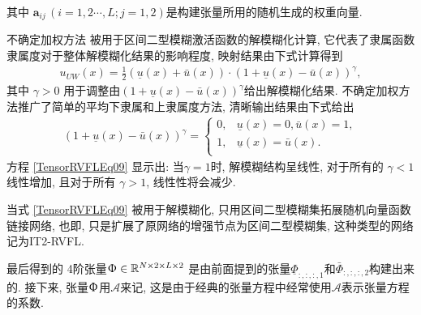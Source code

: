 其中 $\bm {a} _{ij} \,(i=1,2\cdots,L; j=1,2)$是构建张量所用的随机生成的权重向量.
\begin{remark}
不确定加权方法\cite{RunklerCoupland2018-6356} 被用于区间二型模糊激活函数的解模糊化计算,
它代表了隶属函数隶属度对于整体解模糊化结果的影响程度, 映射结果由下式计算得到
\begin{align} \label{TensorRVFLEq08}
    u_{UW} (x) =\frac 1 2 (\underline u(x) + \bar u(x))\cdot (1+\underline u(x)-\bar u(x))^\gamma,
\end{align}
其中 $\gamma > 0$ 用于调整由$(1+\underline u(x)-\bar u(x))^\gamma$给出解模糊化结果.
不确定加权方法推广了简单的平均下隶属和上隶属度方法, 清晰输出结果由下式给出
\begin{align} \label{TensorRVFLEq09}
  (1+\underline u(x)-\bar u(x))^\gamma=
  \left\{
  \begin{array} {ll}
    0,& \underline u(x)=0, \bar u(x)=1,\\
    1,&\underline u(x)=\bar u(x).\\
  \end{array}
  \right.
\end{align}
方程 \eqref{TensorRVFLEq09} 显示出: 当$\gamma =1$时, 解模糊结构呈线性, 对于所有的 $\gamma<1$ 线性增加, 且对于所有 $\gamma>1$, 线性性将会减少.
\end{remark}
\begin{remark}
当式 \eqref{TensorRVFLEq09} 被用于解模糊化, 只用区间二型模糊集拓展随机向量函数链接网络, 也即, 只是扩展了原网络的增强节点为区间二型模糊集, 这种类型的网络记为IT2-RVFL.
\end{remark}

最后得到的 4阶张量$\Upphi \in \mathbb R^{N\times 2\times L \times 2}$ 是由前面提到的张量$\underline\Phi_{:,:,:,1} $和$\bar \Phi_{:,:,:,2} $构建出来的.
接下来, 张量$\Upphi$用$\mathcal A$来记,  这是由于经典的张量方程中经常使用$\mathcal A$表示张量方程的系数.

